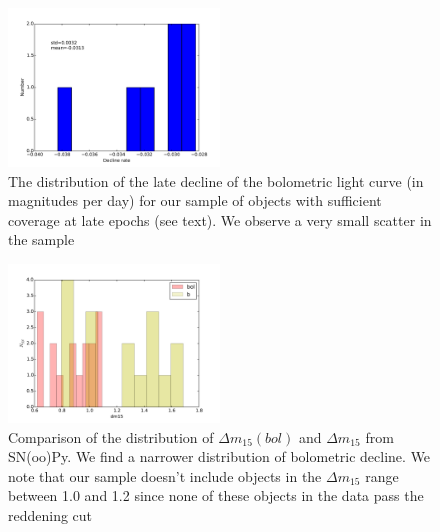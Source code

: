 \begin{figure}
\includegraphics[width=0.5\textwidth, height=0.3\textwidth, trim=0 30 0 30]{../plot_rel/Late_decl_distrib.pdf}
\caption{The distribution of the late decline of the bolometric light curve (in magnitudes per day) for our sample of objects with sufficient coverage at late epochs (see text). We observe a very small
scatter in the sample}
\end{figure}
\begin{figure}
\includegraphics[width=0.5\textwidth, height=0.3\textwidth, trim=0 30 0 30]{../plot_rel/dm15_bol_b.pdf}
\caption{Comparison of the distribution of $\Delta m_{15}(bol)$ and  $\Delta m_{15}$ from SN(oo)Py. We find a narrower distribution of bolometric decline. We note that our sample doesn't
include objects in the $\Delta m_{15}$ range between 1.0 and 1.2 since none of these objects in the data pass the reddening cut}
\end{figure}
